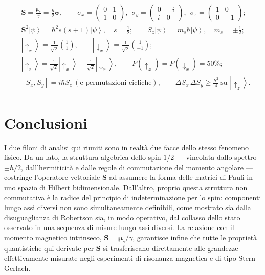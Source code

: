 \documentclass[11pt,a4paper]{article}
\newcommand{\ket}[1]{\left|#1\right\rangle}
\begin{document}
\begin{sintesi}
\begin{align*}
&\mathbf{S} = \frac{\boldsymbol{\mu}_s}{\gamma} = \frac{\hbar}{2}\boldsymbol{\sigma},
\qquad
\sigma_x=\begin{pmatrix}0&1\\1&0\end{pmatrix}, \ \
\sigma_y=\begin{pmatrix}0&-i\\i&0\end{pmatrix}, \ \
\sigma_z=\begin{pmatrix}1&0\\0&-1\end{pmatrix};\\[4pt]
&\mathbf{S}^2\ket{\psi}=\hbar^2 s(s+1)\ket{\psi}, \quad s=\tfrac12; \qquad
S_z\ket{\psi}=m_s\hbar\ket{\psi}, \quad m_s=\pm\tfrac12;\\[4pt]
&\ket{\uparrow_x}=\tfrac{1}{\sqrt2}\binom{1}{1}, \qquad \ket{\downarrow_x}=\tfrac{1}{\sqrt2}\binom{1}{-1};\\[4pt]
&\ket{\uparrow_z} = \tfrac{1}{\sqrt2}\ket{\uparrow_x}+\tfrac{1}{\sqrt2}\ket{\downarrow_x}, \qquad
P(\uparrow_x)=P(\downarrow_x)=50\%;\\[4pt]
&[S_x,S_y]=i\hbar S_z \ (\text{e permutazioni cicliche}), \qquad \Delta S_x\,\Delta S_y \ge \frac{\hbar^2}{4} \ \text{su } \ket{\uparrow_z}.
\end{align*}
\end{sintesi}

\section{Conclusioni}

I due filoni di analisi qui riuniti sono in realtà due facce dello stesso fenomeno fisico. Da un lato, la struttura algebrica dello spin $1/2$ — vincolata dallo spettro $\pm\hbar/2$, dall'hermiticità e dalle regole di commutazione del momento angolare — costringe l'operatore vettoriale $\mathbf{S}$ ad assumere la forma delle matrici di Pauli in uno spazio di Hilbert bidimensionale. Dall'altro, proprio questa struttura non commutativa è la radice del principio di indeterminazione per lo spin: componenti lungo assi diversi non sono simultaneamente definibili, come mostrato sia dalla disuguaglianza di Robertson sia, in modo operativo, dal collasso dello stato osservato in una sequenza di misure lungo assi diversi. La relazione con il momento magnetico intrinseco, $\mathbf{S}=\boldsymbol{\mu}_s/\gamma$, garantisce infine che tutte le proprietà quantistiche qui derivate per $\mathbf{S}$ si trasferiscano direttamente alle grandezze effettivamente misurate negli esperimenti di risonanza magnetica e di tipo Stern-Gerlach.
\end{document}
